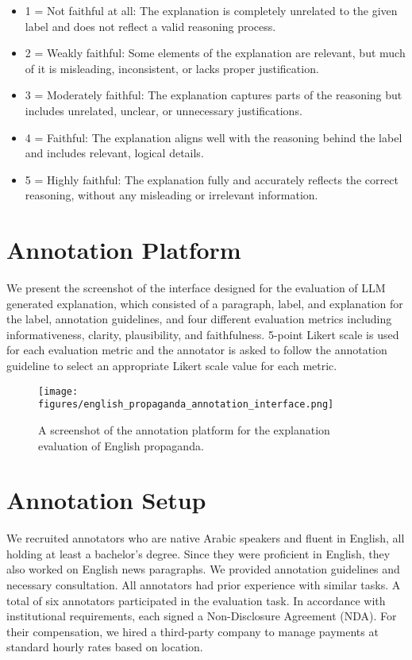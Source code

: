 \begin{itemize}[noitemsep,topsep=0pt,labelsep=.5em]
    \item 1 = Not faithful at all: The explanation is completely unrelated to the given label and does not reflect a valid reasoning process.
    \item 2 = Weakly faithful: Some elements of the explanation are relevant, but much of it is misleading, inconsistent, or lacks proper justification.
    \item 3 = Moderately faithful: The explanation captures parts of the reasoning but includes unrelated, unclear, or unnecessary justifications.
    \item 4 = Faithful: The explanation aligns well with the reasoning behind the label and includes relevant, logical details.
    \item 5 = Highly faithful: The explanation fully and accurately reflects the correct reasoning, without any misleading or irrelevant information.
\end{itemize}

\section{Annotation Platform}
\label{sec:app_annotation_platform}

We present the screenshot of the interface designed for the evaluation of LLM generated explanation, which consisted
of a paragraph, label, and explanation for the label, annotation guidelines, and four different evaluation metrics including informativeness, clarity, plausibility, and faithfulness. 5-point Likert scale is used for each evaluation metric and the annotator is asked to follow the annotation guideline to select an appropriate Likert scale value for each metric.

\begin{figure*}[]
    \centering
    \texttt{[image: figures/english\_propaganda\_annotation\_interface.png]}
    \caption{A screenshot of the annotation platform for the explanation evaluation of English propaganda.}
    \label{fig:hateful_meme_annotation_interface}
\end{figure*}

\section{Annotation Setup}
\label{sec:app_annotation_setup}
We recruited annotators who are native Arabic speakers and fluent in English, all holding at least a bachelor's degree. Since they were proficient in English, they also worked on English news paragraphs. We provided annotation guidelines and necessary consultation. All annotators had prior experience with similar tasks. A total of six annotators participated in the evaluation task. In accordance with institutional requirements, each signed a Non-Disclosure Agreement (NDA). For their compensation, we hired a third-party company to manage payments at standard hourly rates based on location.



